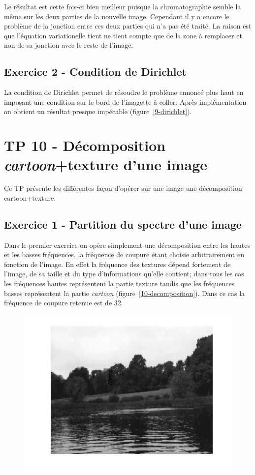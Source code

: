 \documentclass{article}
\begin{document}
Le résultat est cette fois-ci bien meilleur puisque la chromatographie semble la même sur les deux parties de la nouvelle image. Cependant il y a encore le problème de la jonction entre ces deux parties qui n'a pas été traité. La raison est que l'équation variationelle tient ne tient compte que de la zone à remplacer et non de sa jonction avec le reste de l'image.

\subsection{Exercice 2 - Condition de Dirichlet}
La condition de Dirichlet permet de résoudre le problème ennoncé plus haut en imposant une condition sur le bord de l'imagette à coller. Après implémentation on obtient un résultat presque impécable (figure~\ref{9-dirichlet}).


\section{TP 10 - Décomposition \emph{cartoon}+texture d'une image}
Ce TP présente les différentes façon d'opérer sur une image une décomposition cartoon+texture.

\subsection{Exercice 1 - Partition du spectre d'une image}
Dans le premier exercice on opère simplement une décomposition entre les hautes et les basses fréquences, la fréquence de coupure étant choisie arbitrairement en fonction de l'image. En effet la fréquence des textures dépend fortement de l'image, de sa taille et du type d'informations qu'elle contient; dans tous les cas les fréquences hautes représentent la partie texture tandis que les fréquences basses représentent la partie \emph{cartoon} (figure~\ref{10-decomposition}). Dans ce cas la fréquence de coupure retenue est de 32.

\begin{figure}[!ht]
\includegraphics[width=\textwidth]{images/1/1-1-autumn_b.png}
\end{figure}
\end{document}
